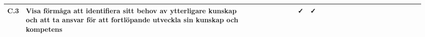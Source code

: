 \begin{sidewaystable}[H]
{\begin{tabular}{lp{16cm}ccccccccccccccccccccccc}
C.3 & Visa förmåga att identifiera sitt behov av ytterligare kunskap och att ta ansvar för att fortlöpande utveckla sin kunskap och kompetens                                                                                                                                                                             &          &          &          &          &          &          & \faCheck & \faCheck &          &          &          &          &          &          &          &          &          &          &          &          &          &          & \tabularnewline                 
\bottomrule
\end{tabular}}
\end{sidewaystable}
